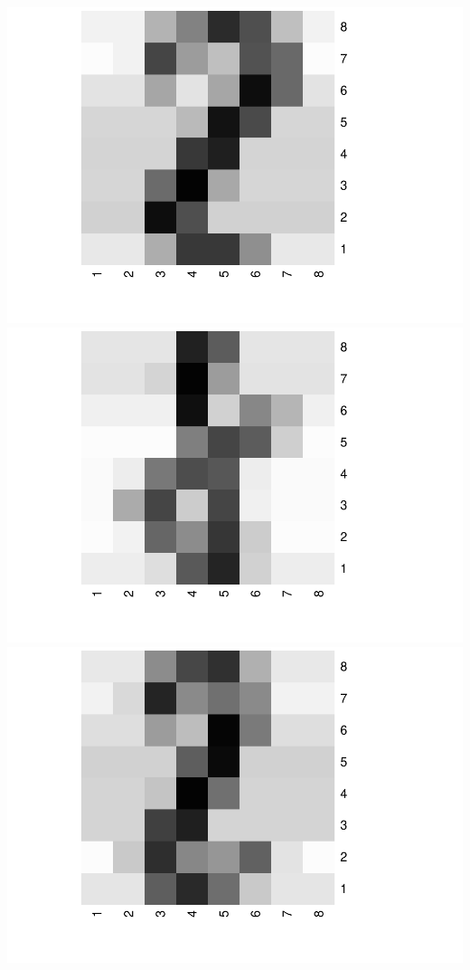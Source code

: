 \documentclass[
]{article}
\begin{document}
\includegraphics{lab1_report_files/figure-latex/1.3.3-3.pdf}
\includegraphics{lab1_report_files/figure-latex/1.3.3-4.pdf}
\includegraphics{lab1_report_files/figure-latex/1.3.3-5.pdf}
\end{document}
